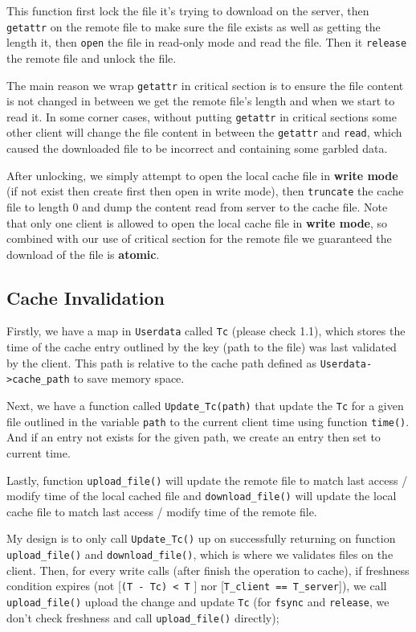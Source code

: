 \documentclass[11pt,a4paper]{article}
\begin{document}
This function first lock the file it's trying to download on the server, then \texttt{getattr} on the remote file to make sure the file exists as well as getting the length it, then \texttt{open} the file in read-only mode and read the file.  Then it \texttt{release} the remote file and unlock the file.

The main reason we wrap \texttt{getattr} in critical section is to ensure the file content is not changed in between we get the remote file's length and when we start to read it. In some corner cases, without putting \texttt{getattr} in critical sections some other client will change the file content in between the \texttt{getattr} and \texttt{read}, which caused the downloaded file to be incorrect and containing some garbled data.

After unlocking, we simply attempt to open the local cache file in \textbf{write mode} (if not exist then create first then open in write mode), then \texttt{truncate} the cache file to length 0 and dump the content read from server to  the cache file. Note that only one client is allowed to open the local cache file in \textbf{write mode}, so combined with our use of critical section for the remote file we guaranteed the download of the file is \textbf{atomic}.

\subsection{Cache Invalidation}

Firstly, we have a map in \texttt{Userdata} called \texttt{Tc} (please check 1.1), which stores the time of the cache entry outlined by the key (path to the file) was last validated by the client. This path is relative to the cache path defined as \texttt{Userdata->cache\_path} to save memory space.

Next, we have a function called \texttt{Update\_Tc(path)} that update the \texttt{Tc} for a given file outlined in the variable \texttt{path} to the current client time using function \texttt{time()}. And if an entry not exists for the given path, we create an entry then set to current time.

Lastly, function \texttt{upload\_file()} will update the remote file to match last access / modify time of the local cached file and \texttt{download\_file()} will update the local cache file to match last access / modify time of the remote file.

My design is to only call \texttt{Update\_Tc()} up on successfully returning on function \texttt{upload\_file()} and \texttt{download\_file()}, which is where we validates files on the client. Then, for every write calls (after finish the operation to cache), if freshness condition expires (not [\texttt{(T - Tc) < T} ] nor [\texttt{T\_client == T\_server}]), we call \texttt{upload\_file()} upload the change and update \texttt{Tc} (for \texttt{fsync} and \texttt{release}, we don't check freshness and call \texttt{upload\_file()} directly); 
\end{document}
